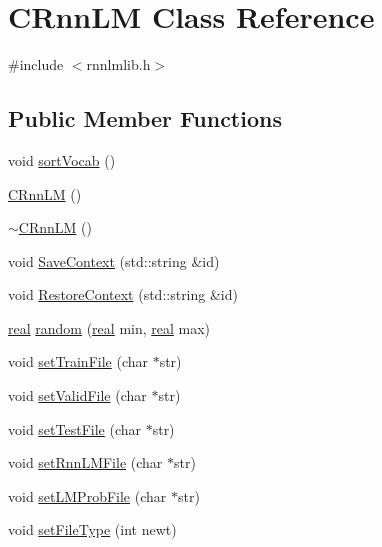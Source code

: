 \hypertarget{class_c_rnn_l_m}{}\section{C\+Rnn\+LM Class Reference}
\label{class_c_rnn_l_m}


{\ttfamily \#include $<$rnnlmlib.\+h$>$}

\subsection*{Public Member Functions}
\begin{DoxyCompactItemize}
\item 
void \hyperlink{class_c_rnn_l_m_a1ddfb1f8b9e511d028409900fa3197fa}{sort\+Vocab} ()
\item 
\hyperlink{class_c_rnn_l_m_a6a8301e9d441ac7e2e7740ba739b9465}{C\+Rnn\+LM} ()
\item 
\hyperlink{class_c_rnn_l_m_a80ba32764e24e2f5a1a9d90c693977f7}{$\sim$\+C\+Rnn\+LM} ()
\item 
void \hyperlink{class_c_rnn_l_m_a0118b275ea69fc99e745b668bec24e39}{Save\+Context} (std\+::string \&id)
\item 
void \hyperlink{class_c_rnn_l_m_a4e7221808a41465a624f034eb9a3185f}{Restore\+Context} (std\+::string \&id)
\item 
\hyperlink{rnnlmlib_8h_a11d147c64891830c9e79b3315b1b2e21}{real} \hyperlink{class_c_rnn_l_m_af171a2d00c380a420bc61191185f6f81}{random} (\hyperlink{rnnlmlib_8h_a11d147c64891830c9e79b3315b1b2e21}{real} min, \hyperlink{rnnlmlib_8h_a11d147c64891830c9e79b3315b1b2e21}{real} max)
\item 
void \hyperlink{class_c_rnn_l_m_a3c65833d45dc29fddd95741311d3f8b5}{set\+Train\+File} (char $\ast$str)
\item 
void \hyperlink{class_c_rnn_l_m_a845d9a04d0c9783308644ba1874a8cfd}{set\+Valid\+File} (char $\ast$str)
\item 
void \hyperlink{class_c_rnn_l_m_a87394397b48e91a20d53ae1e98a5026d}{set\+Test\+File} (char $\ast$str)
\item 
void \hyperlink{class_c_rnn_l_m_aa9d2c0a53ff437281dca20b694d72da0}{set\+Rnn\+L\+M\+File} (char $\ast$str)
\item 
void \hyperlink{class_c_rnn_l_m_a43ff2e6771fdbc21d5beb89177b5e4e3}{set\+L\+M\+Prob\+File} (char $\ast$str)
\item 
void \hyperlink{class_c_rnn_l_m_a6390c14783786954f4db7616b7f1e576}{set\+File\+Type} (int newt)
\item 

\end{DoxyCompactItemize}
